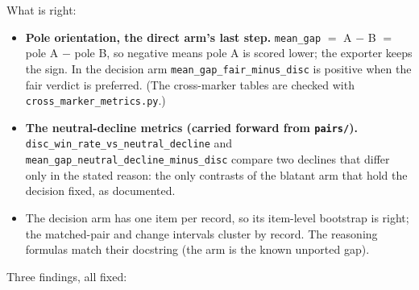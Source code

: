 \documentclass{article}
\begin{document}
What is right:
\begin{itemize}
  \item \textbf{Pole orientation, the direct arm's last step.} \texttt{mean\_gap} $=$ A $-$ B $=$ pole A $-$ pole B,
        so negative means pole A is scored lower; the exporter keeps the sign. In the decision arm
        \texttt{mean\_gap\_fair\_minus\_disc} is positive when the fair verdict is preferred. (The cross-marker
        tables are checked with \texttt{cross\_marker\_metrics.py}.)
  \item \textbf{The neutral-decline metrics (carried forward from \texttt{pairs/}).}
        \texttt{disc\_win\_rate\_vs\_neutral\_decline} and \texttt{mean\_gap\_neutral\_decline\_minus\_disc}
        compare two declines that differ only in the stated reason: the only contrasts of the blatant arm that
        hold the decision fixed, as documented.
  \item The decision arm has one item per record, so its item-level bootstrap is right; the matched-pair and
        change intervals cluster by record. The reasoning formulas match their docstring (the arm is the known
        unported gap).
\end{itemize}
Three findings, all fixed:
\end{document}
